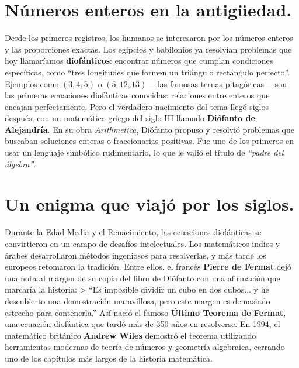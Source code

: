 
\vspace{0.5cm}

\vspace{1em}
\section*{Números enteros en la antigüedad.}

\begin{reseñaplana}
Desde los primeros registros, los humanos se interesaron por los números enteros y las proporciones exactas.  
Los egipcios y babilonios ya resolvían problemas que hoy llamaríamos \textbf{diofánticos}: encontrar números 
que cumplan condiciones específicas, como “tres longitudes que formen un triángulo rectángulo perfecto”.  
Ejemplos como $(3,4,5)$ o $(5,12,13)$ —las famosas ternas pitagóricas— son las primeras ecuaciones diofánticas conocidas: 
relaciones entre enteros que encajan perfectamente.  
Pero el verdadero nacimiento del tema llegó siglos después, con un matemático griego del siglo III 
llamado \textbf{Diófanto de Alejandría}.  
En su obra \textit{Arithmetica}, Diófanto propuso y resolvió problemas que buscaban soluciones enteras o fraccionarias positivas.  
Fue uno de los primeros en usar un lenguaje simbólico rudimentario, lo que le valió el título de \textit{“padre del álgebra”}.  
\end{reseñaplana}

\section*{Un enigma que viajó por los siglos.}
\begin{reseñaplana}
Durante la Edad Media y el Renacimiento, las ecuaciones diofánticas se convirtieron en un campo de desafíos intelectuales.  
Los matemáticos indios y árabes desarrollaron métodos ingeniosos para resolverlas, y más tarde los europeos retomaron la tradición.  
Entre ellos, el francés \textbf{Pierre de Fermat} dejó una nota al margen de su copia del libro de Diófanto con una afirmación que marcaría la historia:  
> “Es imposible dividir un cubo en dos cubos... y he descubierto una demostración maravillosa, pero este margen es demasiado estrecho para contenerla.”  
Así nació el famoso \textbf{Último Teorema de Fermat}, una ecuación diofántica que tardó más de 350 años en resolverse.  
En 1994, el matemático británico \textbf{Andrew Wiles} demostró el teorema utilizando herramientas modernas de teoría de números y 
geometría algebraica, cerrando uno de los capítulos más largos de la historia matemática.  
\end{reseñaplana} 

